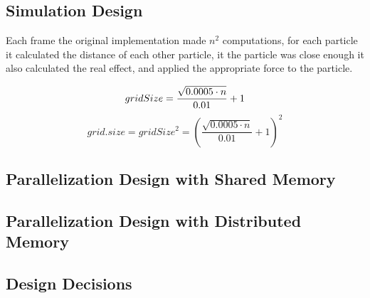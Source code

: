 
    \subsection{Simulation Design}

        Each frame the original implementation made $n^2$ computations, for each
        particle it calculated the distance of each other particle, it the
        particle was close enough it also calculated the real effect, and
        applied the appropriate force to the particle. 

        \begin{equation}
            gridSize = \frac{\sqrt{0.0005 \cdot n}}{0.01} + 1 \\
        \end{equation}
        \begin{equation}
            grid.size = gridSize^2 = \left(\frac{\sqrt{0.0005 \cdot n}}{0.01} + 1\right)^2
        \end{equation}

    \subsection{Parallelization Design with Shared Memory}%

    \subsection{Parallelization Design with Distributed Memory}%

    \subsection{Design Decisions}%
